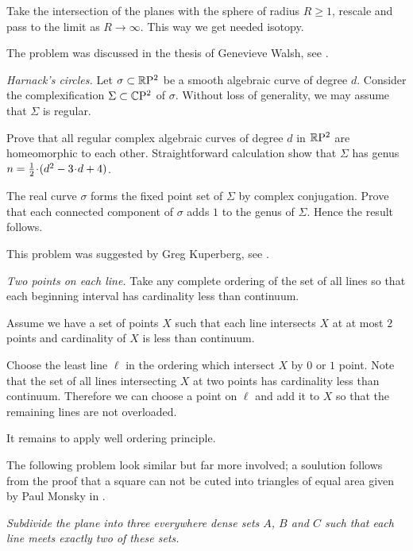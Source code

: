 Take the intersection of the planes with the sphere of radius $R\ge 1$,
rescale and pass to the limit as $R\to\infty$.  
This way we get needed isotopy.

The problem was discussed in the thesis of Genevieve Walsh, see \cite{walsh}.

\textit{Harnack's circles.}
Let $\sigma\subset \mathbb{R}\mathrm{P}^2$ be a smooth algebraic curve of degree $d$.
Consider the complexification $\Sigma\subset \mathbb{C}\mathrm{P}^2$ of $\sigma$.
Without loss of generality, we may assume that $\Sigma$ is regular.

Prove that all regular complex algebraic curves of degree $d$ in $\mathbb{R}\mathrm{P}^2$
are homeomorphic to each other.
Straightforward calculation show that $\Sigma$ has genus $n\z=\tfrac12\cdot(d^2-3\cdot d+4)$.

The real curve $\sigma$ forms the fixed point set of $\Sigma$ by complex conjugation. 
Prove that each connected component of $\sigma$ adds $1$ to the genus of $\Sigma$.
Hence the result follows.

This problem was suggested by Greg Kuperberg, see \cite{One-step problems in geometry}.



\textit{Two points on each line.}
Take any complete ordering of the set of all lines 
so that each beginning interval has cardinality less than continuum.

Assume we have a set of points $X$ such that each line intersects $X$ at at most $2$ points and cardinality of $X$ is less than continuum.

Choose the least line $\ell$ in the ordering which intersect $X$ 
by $0$ or $1$ point.
Note that the set of all lines intersecting $X$ at two points has cardinality less than continuum.
Therefore we can choose a point on $\ell$ and add it to $X$ so that the remaining lines are not overloaded.

It remains to apply well ordering principle.

The following problem look similar but far more involved;
a soulution follows from the proof that a square can not be cuted into triangles of equal area given by Paul Monsky in \cite{monsky}.

{\it Subdivide the plane into three everywhere dense sets $A$, $B$ and $C$ such that each line meets exactly two of these sets.
}



